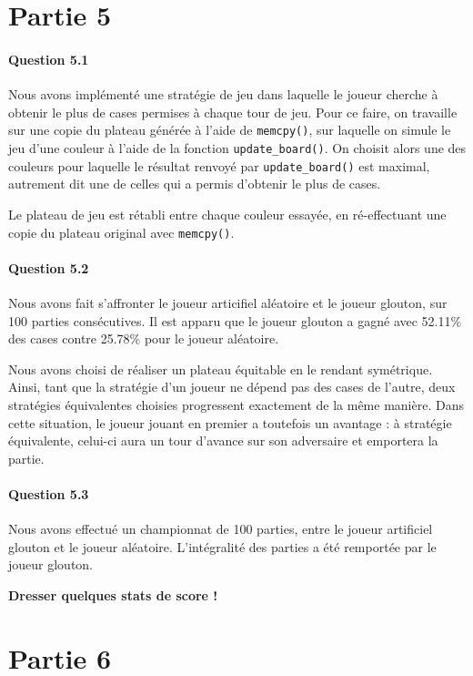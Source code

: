 \documentclass[a4paper]{article}
\begin{document}
    \section{Partie 5}
    \paragraph{Question 5.1}
    Nous avons implémenté une stratégie de jeu dans laquelle le joueur cherche 
à obtenir le plus de cases permises à chaque tour de jeu. Pour ce faire, on 
travaille sur une copie du plateau générée à l'aide de \texttt{memcpy()}, sur 
laquelle on simule le jeu d'une couleur à l'aide de la fonction 
\texttt{update\_board()}. On choisit alors une des couleurs pour laquelle le 
résultat renvoyé par \texttt{update\_board()} est maximal, autrement dit une de 
celles qui a permis d'obtenir le plus de cases.

Le plateau de jeu est rétabli entre chaque couleur essayée, en ré-effectuant 
une copie du plateau original avec \texttt{memcpy()}.

    \paragraph{Question 5.2}
    Nous avons fait s'affronter le joueur articifiel aléatoire et le joueur 
glouton, sur 100 parties consécutives. Il est apparu que le joueur glouton a 
gagné avec 52.11\% des cases contre 25.78\% pour le joueur aléatoire.

Nous avons choisi de réaliser un plateau équitable en le rendant symétrique. 
Ainsi, tant que la stratégie d'un joueur ne dépend pas des cases de l'autre, 
deux stratégies équivalentes choisies progressent exactement de la même 
manière. Dans cette situation, le joueur jouant en premier a toutefois un 
avantage : à stratégie équivalente, celui-ci aura un tour d'avance sur son 
adversaire et emportera la partie.
    \paragraph{Question 5.3}
    Nous avons effectué un championnat de 100 parties, entre le joueur 
artificiel glouton et le joueur aléatoire. L'intégralité des parties a été 
remportée par le joueur glouton.

\textbf{Dresser quelques stats de score !}

    \section{Partie 6}
\end{document}
